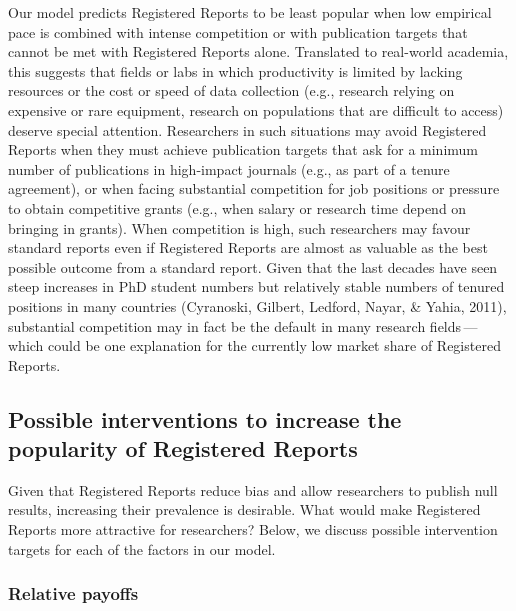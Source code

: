 \documentclass[
  british,
  a4paper,
  ,man,mask,floatsintext]{apa6}
\begin{document}
Our model predicts Registered Reports to be least popular when low empirical pace is combined with intense competition or with publication targets that cannot be met with Registered Reports alone.
Translated to real-world academia, this suggests that fields or labs in which productivity is limited by lacking resources or the cost or speed of data collection (e.g., research relying on expensive or rare equipment, research on populations that are difficult to access) deserve special attention.
Researchers in such situations may avoid Registered Reports when they must achieve publication targets that ask for a minimum number of publications in high-impact journals (e.g., as part of a tenure agreement), or when facing substantial competition for job positions or pressure to obtain competitive grants (e.g., when salary or research time depend on bringing in grants).
When competition is high, such researchers may favour standard reports even if Registered Reports are almost as valuable as the best possible outcome from a standard report.
Given that the last decades have seen steep increases in PhD student numbers but relatively stable numbers of tenured positions in many countries (Cyranoski, Gilbert, Ledford, Nayar, \& Yahia, 2011), substantial competition may in fact be the default in many research fields\(\,\)---\(\,\)which could be one explanation for the currently low market share of Registered Reports.

\par\vspace{.8\baselineskip}

\subsection{Possible interventions to increase the popularity of Registered Reports}\label{possible-interventions-to-increase-the-popularity-of-registered-reports}

Given that Registered Reports reduce bias and allow researchers to publish null results, increasing their prevalence is desirable.
What would make Registered Reports more attractive for researchers?
Below, we discuss possible intervention targets for each of the factors in our model.

\par\vspace{0.4\baselineskip}

\subsubsection{Relative payoffs}\label{relative-payoffs}
\end{document}
